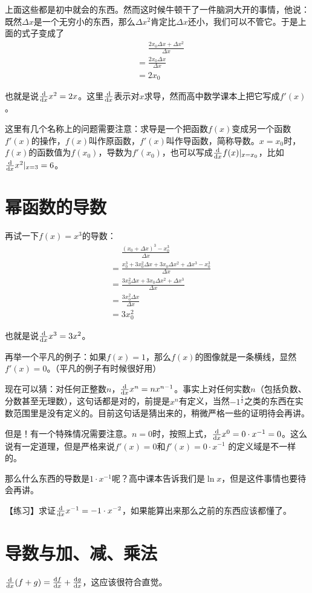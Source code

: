 上面这些都是初中就会的东西。然而这时候牛顿干了一件脑洞大开的事情，他说：既然$\Delta x$是一个无穷小的东西，那么$\Delta x^2$肯定比$\Delta x$还小，我们可以不管它。于是上面的式子变成了
\begin{align*}
&\mathrel{\phantom{=}}\frac{2 x_0 \Delta x+\Delta x^2}{\Delta x} \\
&=\frac{2 x_0 \Delta x}{\Delta x} \\
&=2 x_0
\end{align*}

也就是说$\frac{\mathop{}\!\mathrm{d}}{\mathop{}\!\mathrm{d} x} x^2=2 x$。这里$\frac{\mathop{}\!\mathrm{d}}{\mathop{}\!\mathrm{d} x}$表示对$x$求导，然而高中数学课本上把它写成$f'(x)$。

这里有几个名称上的问题需要注意：求导是一个把函数$f(x)$变成另一个函数$f'(x)$的操作，$f(x)$叫作原函数，$f'(x)$叫作导函数，简称导数。$x=x_0$时，$f(x)$的函数值为$f(x_0)$，导数为$f'(x_0)$，也可以写成$\frac{\mathop{}\!\mathrm{d}}{\mathop{}\!\mathrm{d} x} f(x)|_{x=x_0}$，比如$\frac{\mathop{}\!\mathrm{d}}{\mathop{}\!\mathrm{d} x} x^2|_{x=3}=6$。
\section{幂函数的导数}
再试一下$f(x)=x^3$的导数：
\begin{align*}
&\mathrel{\phantom{=}}\frac{(x_0+\Delta x)^3-x_0^3}{\Delta x} \\
&=\frac{x_0^3+3 x_0^2 \Delta x+3 x_0 \Delta x^2+\Delta x^3-x_0^3}{\Delta x} \\
&=\frac{3 x_0^2 \Delta x+3 x_0 \Delta x^2+\Delta x^3}{\Delta x} \\
&=\frac{3 x_0^2 \Delta x}{\Delta x} \\
&=3 x_0^2
\end{align*}

也就是说$\frac{\mathop{}\!\mathrm{d}}{\mathop{}\!\mathrm{d} x} x^3=3 x^2$。

再举一个平凡的例子：如果$f(x)=1$，那么$f(x)$的图像就是一条横线，显然$f'(x)=0$。（平凡的例子有时候很好用）

现在可以猜：对任何正整数$n$，$\frac{\mathop{}\!\mathrm{d}}{\mathop{}\!\mathrm{d} x} x^n=n x^{n-1}$。事实上对任何实数$n$（包括负数、分数甚至无理数），这句话都是对的，前提是$x^n$有定义，当然$-1^{\frac{1}{2}}$之类的东西在实数范围里是没有定义的。目前这句话是猜出来的，稍微严格一些的证明待会再讲。

但是！有一个特殊情况需要注意。$n=0$时，按照上式，$\frac{\mathop{}\!\mathrm{d}}{\mathop{}\!\mathrm{d} x} x^0=0 \cdot x^{-1}=0$。这么说有一定道理，但是严格来说$f'(x)=0$和$f'(x)=0 \cdot x^{-1}$ 的定义域是不一样的。

那么什么东西的导数是$1 \cdot x^{-1}$呢？高中课本告诉我们是$\ln x$，但是这件事情也要待会再讲。

【练习】求证$\frac{\mathop{}\!\mathrm{d}}{\mathop{}\!\mathrm{d} x} x^{-1}=-1 \cdot x^{-2}$，如果能算出来那么之前的东西应该都懂了。
\section{导数与加、减、乘法}
$\frac{\mathop{}\!\mathrm{d}}{\mathop{}\!\mathrm{d} x}(f+g)=\frac{\mathop{}\!\mathrm{d} f}{\mathop{}\!\mathrm{d} x}+\frac{\mathop{}\!\mathrm{d} g}{\mathop{}\!\mathrm{d} x}$，这应该很符合直觉。

